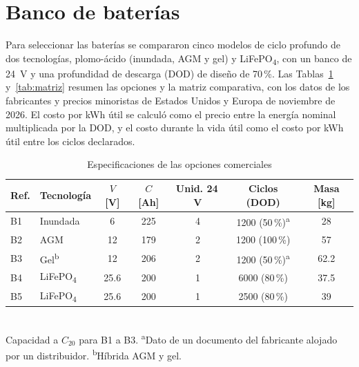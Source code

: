 \section{Banco de baterías}\label{sec:baterias}

Para seleccionar las baterías se compararon cinco modelos de ciclo profundo de dos tecnologías, plomo-ácido (inundada, AGM y gel) y LiFePO\textsubscript{4}, con un banco de \SI{24}{V} y una profundidad de descarga (DOD) de diseño de 70\,\%. Las Tablas~\ref{tab:opciones} y~\ref{tab:matriz} resumen las opciones y la matriz comparativa, con los datos de los fabricantes \cite{trojan_t105, trojan_sig, trojan_saes, ultracell, pq, victron_ds} y precios minoristas de Estados Unidos y Europa de noviembre de 2026. El costo por kWh útil se calculó como el precio entre la energía nominal multiplicada por la DOD, y el costo durante la vida útil como el costo por kWh útil entre los ciclos declarados.

\begin{table}[!htb]
\caption{Especificaciones de las opciones comerciales}
\label{tab:opciones}
\centering
\footnotesize
\setlength{\tabcolsep}{2.2pt}
\begin{tabular}{l l c c c c c}
\toprule
Ref. & Tecnología & $V$ [V] & $C$ [Ah] & Unid. 24\,V & Ciclos (DOD) & Masa [kg] \\
\midrule
B1 & Inundada & 6 & 225 & 4 & 1200 (50\,\%)\textsuperscript{a} & 28 \\
B2 & AGM & 12 & 179 & 2 & 1200 (100\,\%) & 57 \\
B3 & Gel\textsuperscript{b} & 12 & 206 & 2 & 1200 (50\,\%)\textsuperscript{a} & 62.2 \\
B4 & LiFePO\textsubscript{4} & 25.6 & 200 & 1 & 6000 (80\,\%) & 37.5 \\
B5 & LiFePO\textsubscript{4} & 25.6 & 200 & 1 & 2500 (80\,\%) & 39 \\
\bottomrule
\end{tabular}
\\[2pt]
{\footnotesize Capacidad a $C_{20}$ para B1 a B3. \textsuperscript{a}Dato de un documento del fabricante alojado por un distribuidor. \textsuperscript{b}Híbrida AGM y gel.}
\end{table}

